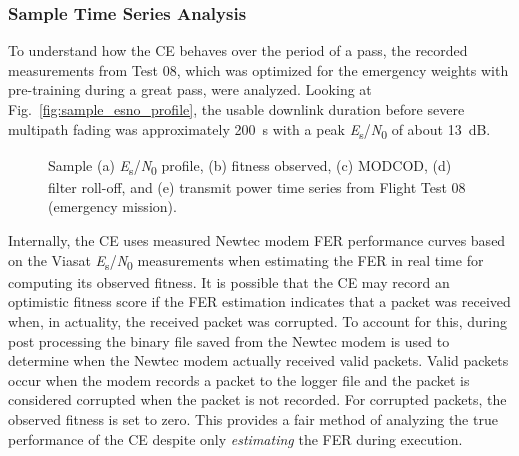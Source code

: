 \documentclass[journal]{IEEEtran}
\let\MYoriglatexcaption\caption
\renewcommand{\caption}[2][\relax]{\MYoriglatexcaption[#2]{#2}}
\begin{document}
\subsubsection{Sample Time Series Analysis}
To understand how the CE behaves over the period of a pass, the recorded measurements from Test 08, which was optimized for the emergency weights with pre-training during a great pass, were analyzed.  Looking at Fig.~\ref{fig:sample_esno_profile}, the usable downlink duration before severe multipath fading was approximately 200~s with a peak \textit{E}\textsubscript{s}/\textit{N}\textsubscript{0} of about 13~dB.

\begin{figure*}[p]
	\centering
 	\hfill
 	\hfill
 	\hfill
 	\hfill
 	\caption{Sample (a) \textit{E}\textsubscript{s}/\textit{N}\textsubscript{0} profile, (b) fitness observed, (c) MODCOD, (d) filter roll-off, and (e) transmit power time series from Flight Test 08 (emergency mission).}
 	\label{fig:sample_time_series}
\end{figure*}

Internally, the CE uses measured Newtec modem FER performance curves based on the Viasat \textit{E}\textsubscript{s}/\textit{N}\textsubscript{0} measurements when estimating the FER in real time for computing its observed fitness.  It is possible that the CE may record an optimistic fitness score if the FER estimation indicates that a packet was received when, in actuality, the received packet was corrupted.  To account for this, during post processing the binary file saved from the Newtec modem is used to determine when the Newtec modem actually received valid packets.  Valid packets occur when the modem records a packet to the logger file and the packet is considered corrupted when the packet is not recorded.  For corrupted packets, the observed fitness is set to zero.  This provides a fair method of analyzing the true performance of the CE despite only \textit{estimating} the FER during execution.
\end{document}

